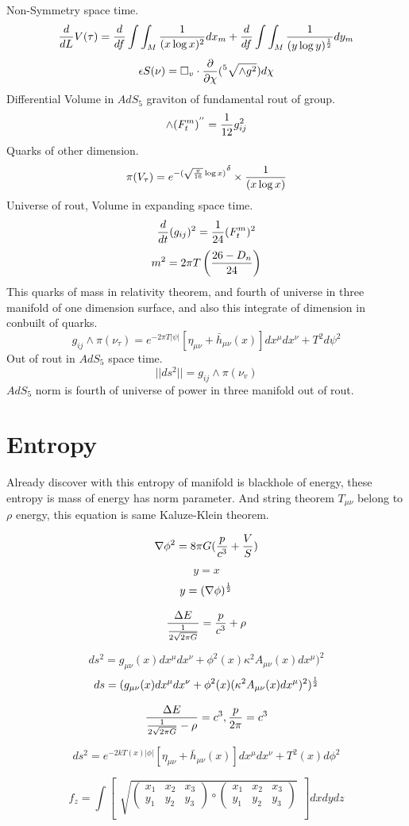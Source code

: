 \documentclass{jsarticle}
\begin{document}
 Non-Symmetry space time.
 $$ {d \over dL}V(\tau) = {d \over df}\int \int_M {1 \over (x \log x)^2}dx_m + {d \over df}\int \int_M
 {1 \over (y \log y)^{1 \over 2}}dy_m $$
 $$ \epsilon S(\nu) = \square_v \cdot {\partial \over \partial \chi}({}^5 \sqrt{\wedge g^2})d\chi $$
 Differential Volume in $AdS_5$ graviton of fundamental rout of group.
 $$ \wedge (F^m_t)^{''} = {1 \over 12}g_{ij}^2$$
 Quarks of other dimension.
 $$ \pi(V_{\tau}) = {e^{-(\sqrt{\pi \over 16}\log x)}}^{\delta} \times {1 \over (x \log x)} $$
 Universe of rout, Volume in expanding space time.
 $$ {d \over dt}(g_{ij})^2 = {1 \over 24}(F^m_t)^2 $$
 $$ m^2 = 2 \pi T \left({26 - D_n \over 24}\right) $$
 This quarks of mass in relativity theorem, and fourth of universe in three manifold of one dimension surface,
 and also this integrate of dimension in conbuilt of quarks.
 $$ g_{ij} \wedge \pi(\nu_{\tau}) = e^{-2 \pi T |\psi|}[\eta_{\mu\nu} + \bar{h}_{\mu\nu}(x)]dx^{\mu}dx^{\nu} 
 + T^2 d \psi^2 $$
 Out of rout in $AdS_5$ space time.
 $$ ||ds^2|| = g_{ij}\wedge \pi(\nu_v) $$
 $AdS_5$ norm is fourth of universe of power in three manifold out of rout.


\section{Entropy}
   Already discover with this entropy of manifold is blackhole of energy, these entropy is mass of energy has
norm parameter. And string theorem $ T_{\mu\nu}$  belong to $ \rho $ energy, this equation is same Kaluze-Klein theorem.


 $$ \nabla \phi^2 = 8 \pi G({p \over c^3} + {V \over S})$$

 $$  y = x $$
 $$  y = (\nabla \phi)^{1 \over 2} $$

  $$ {\Delta E \over {1 \over 2\sqrt{2 \pi G}}} = {p \over c^3} + \rho $$

  $$ ds^2 = g_{\mu\nu}(x)dx^{\mu}dx^{\nu} + \phi^2(x)\kappa^2 A_{\mu\nu}(x)dx^{\mu})^2 $$
  $$ ds = (g_{\mu\nu}(x)dx^{\mu}dx^{\nu} + \phi^2(x)(\kappa^2 A_{\mu\nu}(x)dx^{\mu})^2)^{1 \over 2} $$

  $$ {\Delta E \over {1 \over 2\sqrt{2 \pi G}} - \rho} = c^3, {p \over 2 \pi} = c^3 $$
    

  $$ ds^2 = e^{-2kT(x)|\phi|}[\eta_{\mu\nu} + \bar{h}_{\mu\nu}(x)]dx^{\mu}dx^{\nu} + T^2(x) d\phi^2 $$

  $$ f_{z} = \int \begin{bmatrix} \sqrt{\begin{pmatrix} x_{1} & x_{2} & x_{3} \\
     y_{1} & y_{2} & y_{3} \end{pmatrix}
     \circ
   \begin{pmatrix} x_{1} & x_{2} & x_{3} \\
     y_{1} & y_{2} & y_{3} \end{pmatrix}}_{}
     \end{bmatrix}dxdydz $$
\end{document}
